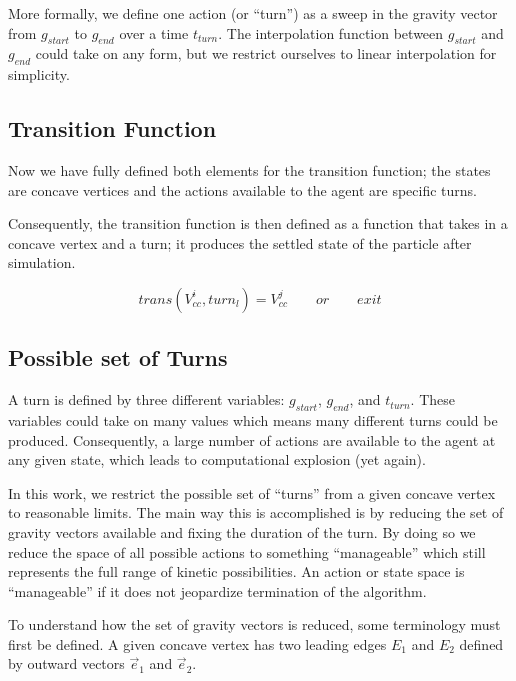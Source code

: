 More formally, we define one action (or ``turn'') as a sweep in the gravity vector from $g_{start}$ to $g_{end}$ over a time $t_{turn}$. The interpolation function between $g_{start}$ and $g_{end}$ could take on any form, but we restrict ourselves to linear interpolation for simplicity.

	\subsection{Transition Function}

Now we have fully defined both elements for the transition function; the states are concave vertices and the actions available to the agent are specific turns.

Consequently, the transition function is then defined as a function that takes in a concave vertex and a turn; it produces the settled state of the particle after simulation.

$$
trans(V_{cc}^{i}, turn_{l}) = V_{cc}^j \qquad or \qquad exit
$$

	\subsection{Possible set of Turns}

A turn is defined by three different variables: $g_{start}$, $g_{end}$, and $t_{turn}$. These variables could take on many values which means many different turns could be produced. Consequently, a large number of actions are available to the agent at any given state, which leads to computational explosion (yet again).


In this work, we restrict the possible set of ``turns'' from a given concave vertex to reasonable limits. The main way this is accomplished is by reducing the set of gravity vectors available and fixing the duration of the turn. By doing so we reduce the space of all possible actions to something ``manageable'' which still represents the full range of kinetic possibilities. An action or state space is ``manageable'' if it does not jeopardize termination of the algorithm.


To understand how the set of gravity vectors is reduced, some terminology must first be defined. A given concave vertex has two leading edges $E_1$ and $E_2$ defined by outward vectors $\vec{e}_1$ and $\vec{e}_2$.


